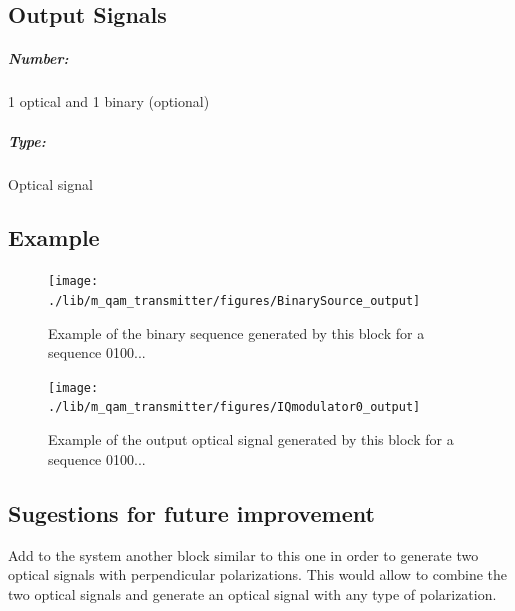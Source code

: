 \subsection*{Output Signals}

\subparagraph*{Number:} 1 optical and 1 binary (optional)

\subparagraph*{Type:} Optical signal

\subsection*{Example}

\begin{figure}[h]
	\centering
	\texttt{[image: ./lib/m\_qam\_transmitter/figures/BinarySource\_output]}
	\caption{Example of the binary sequence generated by this block for a sequence 0100...}
\end{figure}

\begin{figure}[h]
	\centering
	\texttt{[image: ./lib/m\_qam\_transmitter/figures/IQmodulator0\_output]}
	\caption{Example of the output optical signal generated by this block for a sequence 0100...}
\end{figure}

\subsection*{Sugestions for future improvement}

Add to the system another block similar to this one in order to generate two optical signals with perpendicular polarizations. This would allow to combine the two optical signals and generate an optical signal with any type of polarization.
